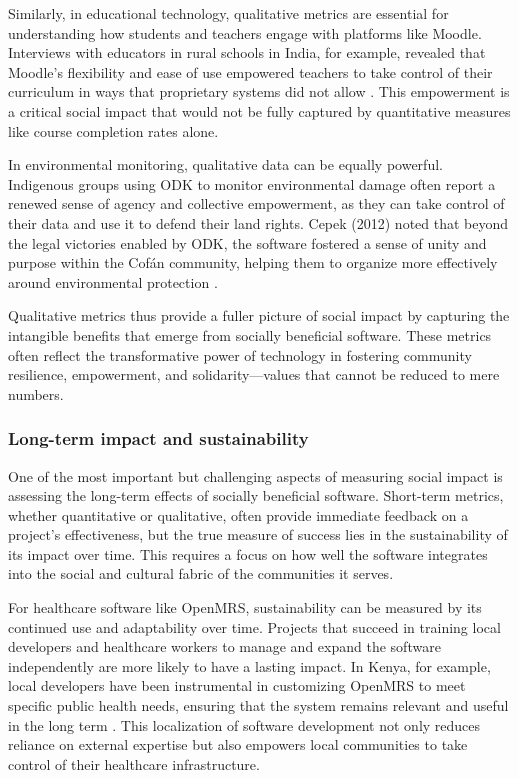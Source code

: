\begin{refsection}
Similarly, in educational technology, qualitative metrics are essential for understanding how students and teachers engage with platforms like Moodle. Interviews with educators in rural schools in India, for example, revealed that Moodle’s flexibility and ease of use empowered teachers to take control of their curriculum in ways that proprietary systems did not allow \cite[pp.~96-99]{selwyn2013}. This empowerment is a critical social impact that would not be fully captured by quantitative measures like course completion rates alone.

In environmental monitoring, qualitative data can be equally powerful. Indigenous groups using ODK to monitor environmental damage often report a renewed sense of agency and collective empowerment, as they can take control of their data and use it to defend their land rights. Cepek (2012) noted that beyond the legal victories enabled by ODK, the software fostered a sense of unity and purpose within the Cofán community, helping them to organize more effectively around environmental protection \cite[pp.~50-52]{cepek2012}.

Qualitative metrics thus provide a fuller picture of social impact by capturing the intangible benefits that emerge from socially beneficial software. These metrics often reflect the transformative power of technology in fostering community resilience, empowerment, and solidarity—values that cannot be reduced to mere numbers.

\subsubsection{Long-term impact and sustainability}

One of the most important but challenging aspects of measuring social impact is assessing the long-term effects of socially beneficial software. Short-term metrics, whether quantitative or qualitative, often provide immediate feedback on a project’s effectiveness, but the true measure of success lies in the sustainability of its impact over time. This requires a focus on how well the software integrates into the social and cultural fabric of the communities it serves.

For healthcare software like OpenMRS, sustainability can be measured by its continued use and adaptability over time. Projects that succeed in training local developers and healthcare workers to manage and expand the software independently are more likely to have a lasting impact. In Kenya, for example, local developers have been instrumental in customizing OpenMRS to meet specific public health needs, ensuring that the system remains relevant and useful in the long term \cite[pp.~153-155]{farmer2010}. This localization of software development not only reduces reliance on external expertise but also empowers local communities to take control of their healthcare infrastructure.


\end{refsection}
